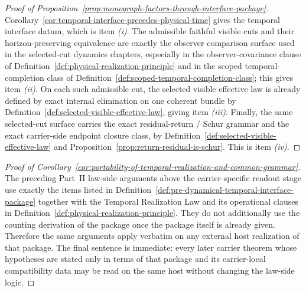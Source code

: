
\begin{proof}[Proof of Proposition~\ref{prop:monograph-factors-through-interface-package}]
\label{proof:prop:monograph-factors-through-interface-package}
Corollary~\ref{cor:temporal-interface-precedes-physical-time} gives the
temporal interface datum, which is item \emph{(i)}. The admissible faithful
visible cuts and their horizon-preserving equivalence are exactly the observer
comparison surface used in the selected-cut dynamics chapters, especially in
the observer-covariance clause of
Definition~\ref{def:physical-realization-principle} and in the scoped
temporal-completion class of
Definition~\ref{def:scoped-temporal-completion-class}; this gives item
\emph{(ii)}. On each such admissible cut, the selected visible effective law is
already defined by exact internal elimination on one coherent bundle by
Definition~\ref{def:selected-visible-effective-law}, giving item \emph{(iii)}.
Finally, the same selected-cut surface carries the exact residual-return /
Schur grammar and the exact carrier-side endpoint closure class, by
Definition~\ref{def:selected-visible-effective-law} and
Proposition~\ref{prop:return-residual-is-schur}. This is item \emph{(iv)}.
\end{proof}

\begin{proof}[Proof of Corollary~\ref{cor:portability-of-temporal-realization-and-common-grammar}]
\label{proof:cor:portability-of-temporal-realization-and-common-grammar}
The preceding Part~II law-side arguments above the carrier-specific readout
stage use exactly the items listed in
Definition~\ref{def:pre-dynamical-temporal-interface-package} together with
the Temporal Realization Law and its operational clauses in
Definition~\ref{def:physical-realization-principle}. They do not additionally
use the counting derivation of the package once the package itself is already
given. Therefore the same arguments apply verbatim on any external host
realization of that package. The final sentence is immediate: every later
carrier theorem whose hypotheses are stated only in terms of that package and
its carrier-local compatibility data may be read on the same host without
changing the law-side logic.
\end{proof}

